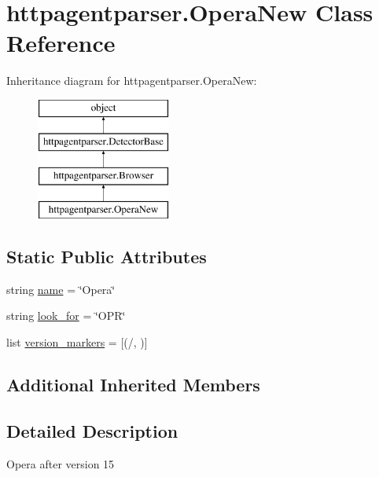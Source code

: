 \hypertarget{classhttpagentparser_1_1_opera_new}{}\section{httpagentparser.\+Opera\+New Class Reference}
\label{classhttpagentparser_1_1_opera_new}
Inheritance diagram for httpagentparser.\+Opera\+New\+:\begin{figure}[H]
\begin{center}
\leavevmode
\includegraphics[height=4.000000cm]{classhttpagentparser_1_1_opera_new}
\end{center}
\end{figure}
\subsection*{Static Public Attributes}
\begin{DoxyCompactItemize}
\item 
string \hyperlink{classhttpagentparser_1_1_opera_new_a28680b84cf8f9da80d744008c4d81f9f}{name} = \char`\"{}Opera\char`\"{}
\item 
string \hyperlink{classhttpagentparser_1_1_opera_new_a8ff857658f0261bf79c88147a9c56662}{look\+\_\+for} = \char`\"{}O\+PR\char`\"{}
\item 
list \hyperlink{classhttpagentparser_1_1_opera_new_af13982459db90db83d5c47339cb0e5ef}{version\+\_\+markers} = \mbox{[}(\textquotesingle{}/\textquotesingle{}, \textquotesingle{}\textquotesingle{})\mbox{]}
\end{DoxyCompactItemize}
\subsection*{Additional Inherited Members}


\subsection{Detailed Description}
\begin{DoxyVerb}Opera after version 15
\end{DoxyVerb}
 

